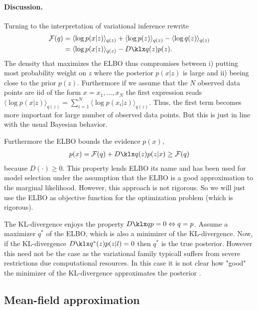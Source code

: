 \paragraph{Discussion.}Turning to the interpretation of variational inference rewrite
\begin{align}
	\mathcal{F}(q) &= \langle \log p(x | z) \rangle _{q(z)} + \langle \log p(z) \rangle _{q(z)}  - \langle \log q(z) \rangle _{q(z)} \nonumber \\ 
	        &= \langle \log p(x | z) \rangle _{q(z)} - \kl{q(z)}{p(z)}.
\end{align}
The density that maximizes the ELBO thus compromises between  i) putting most probability weight on $z$ where the posterior $p(x|z)$ is large and ii) beeing close to the prior $p(z)$. Furthermore if we assume that the $N$ observed data points are iid of the form $x = x_1, \dots, x_N$  the first expression reads $\langle \log p(x | z) \rangle _{q(z)} = \sum _{i = 1} ^N\langle \log p(x_i | z) \rangle _{q(z)}$. Thus, the first term becomes more important for large number of observed data points. But this is just in line with the usual Bayesian behavior.

Furthermore the ELBO bounds the evidence $p(x)$,
\begin{align}
	p(x) = \mathcal{F}(q) + \kl{q(z)}{p(z|x)} \geq \mathcal{F}(q)
\end{align}
because $D(\cdot) \geq 0$. This property lends ELBO its name and has been used for model selection under the assumption that the ELBO is a good approximation to the marginal likelihood. However, this approach is not rigorous. So we will just use the ELBO as objective function for the optimization problem (which is rigorous).

The KL-divergence enjoys the property $\kl{q}{p} = 0 \Leftrightarrow q=p$. Assume a maximizer $q^*$ of the ELBO, which is also a minimizer of the KL-divergence. Now, if the KL-divergence  $\kl{q^*(z)}{p(z|l)} = 0$ then $q^*$ is the true posterior. However this need not be the case as the variational family typicall suffers from severe restrictions due computational resources. In this case it is not clear how "good" the minimizer of the KL-divergence approximates the posterior \cite{minka2005divergence, Leisink01atighter}.

\subsection{Mean-field approximation}

